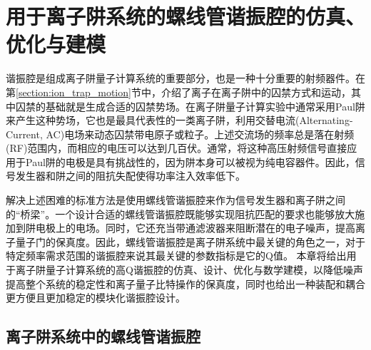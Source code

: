 
\chapter[用于离子阱系统的高Q螺线管谐振腔的仿真、优化与建模]{用于离子阱系统的螺线管谐振腔的仿真、优化与建模\label{section:helical}}
谐振腔是组成离子阱量子计算系统的重要部分，也是一种十分重要的射频器件。在第\ref{section:ion_trap_motion}节中，介绍了离子在离子阱中的囚禁方式和运动，其中囚禁的基础就是生成合适的囚禁势场。在离子阱量子计算实验中通常采用Paul阱来产生这种势场，它也是最具代表性的一类离子阱，利用交替电流(Alternating-Current, AC)电场来动态囚禁带电原子或粒子。上述交流场的频率总是落在射频(RF)范围内，而相应的电压可以达到几百伏。通常，将这种高压射频信号直接应用于Paul阱的电极是具有挑战性的，因为阱本身可以被视为纯电容器件。因此，信号发生器和阱之间的阻抗失配使得功率注入效率低下。

解决上述困难的标准方法是使用螺线管谐振腔来作为信号发生器和离子阱之间的“桥梁”。一个设计合适的螺线管谐振腔既能够实现阻抗匹配的要求也能够放大施加到阱电极上的电场。同时，它还充当带通滤波器来阻断潜在的电子噪声，提高离子量子门的保真度。因此，螺线管谐振腔是离子阱系统中最关键的角色之一，对于特定频率需求范围的谐振腔来说其最关键的参数指标是它的Q值。
本章将给出用于离子阱量子计算系统的高Q谐振腔的仿真、设计、优化与数学建模，以降低噪声提高整个系统的稳定性和离子量子比特操作的保真度\cite[]{van_Dijk_Kawakami_Schouten_Veldhorst_Vandersypen_Babaie_Charbon_Sebastiano_2019}，同时也给出一种装配和耦合更方便且更加稳定的模块化谐振腔设计。




\section[离子阱系统中的螺线管谐振腔]{离子阱系统中的螺线管谐振腔}



